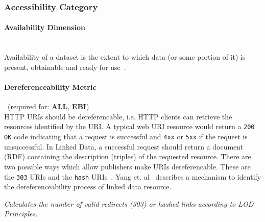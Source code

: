 
\subsubsection{Accessibility Category}
\label{sec:Accessibility} 

\paragraph{Availability Dimension}~\\%
Availability of a dataset is the extent to which data (or some portion of it) is present, obtainable and ready for use~\cite{Zaveri2012:LODQ}.

\paragraph{Dereferenceability Metric}~(required for: \textbf{ALL}, \textbf{EBI})~\\ %
HTTP URIs should be dereferencable, i.e. HTTP clients can retrieve the resources identified by the URI.
A typical web URI resource would return a \texttt{200 OK} code indicating that a request is successful and \texttt{4xx} or \texttt{5xx} if the request is unsuccessful. 
In Linked Data, a successful request should return a document (RDF) containing the description (triples) of the requested resource.
There are two possible ways which allow publishers make URIs dereferencable.
These are the \texttt{303} URIs and the \texttt{hash} URIs~\cite{W3C:CoolURIs}.
Yang et. al~\cite{Yang2011} describes a mechanism to identify the dereferenceability process of linked data resource.
\begin{mdframed}[style=metricdefinition]
\emph{Calculates the number of valid redirects (303) or hashed links according to LOD Principles.}
\end{mdframed}

